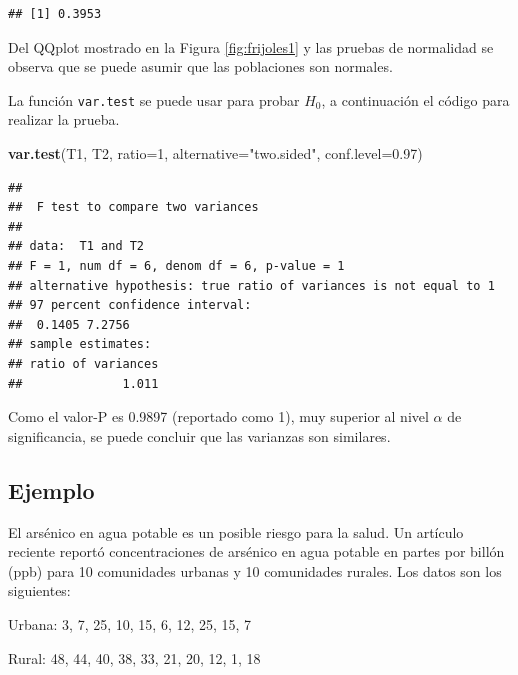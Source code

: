 \documentclass[10pt,]{krantz}
\makeatletter
\newenvironment{Shaded}{\begin{snugshade}}{\end{snugshade}}
\newcommand{\KeywordTok}[1]{\textcolor[rgb]{0.13,0.29,0.53}{\textbf{{#1}}}}
\newcommand{\DataTypeTok}[1]{\textcolor[rgb]{0.13,0.29,0.53}{{#1}}}
\newcommand{\DecValTok}[1]{\textcolor[rgb]{0.00,0.00,0.81}{{#1}}}
\newcommand{\FloatTok}[1]{\textcolor[rgb]{0.00,0.00,0.81}{{#1}}}
\newcommand{\StringTok}[1]{\textcolor[rgb]{0.31,0.60,0.02}{{#1}}}
\newcommand{\NormalTok}[1]{{#1}}
\newenvironment{kframe}{%
\medskip{}
\setlength{\fboxsep}{.8em}
 \def\at@end@of@kframe{}%
 \ifinner\ifhmode%
  \def\at@end@of@kframe{\end{minipage}}%
  \begin{minipage}{\columnwidth}%
 \fi\fi%
 \def\FrameCommand##1{\hskip\@totalleftmargin \hskip-\fboxsep
 \colorbox{shadecolor}{##1}\hskip-\fboxsep
     \hskip-\linewidth \hskip-\@totalleftmargin \hskip\columnwidth}%
 \MakeFramed {\advance\hsize-\width
   \@totalleftmargin\z@ \linewidth\hsize
   \@setminipage}}%
 {\par\unskip\endMakeFramed%
 \at@end@of@kframe}
\renewenvironment{Shaded}{\begin{kframe}}{\end{kframe}}
\makeatother
\begin{document}
\begin{Shaded}
\end{Shaded}

\begin{verbatim}
## [1] 0.3953
\end{verbatim}

Del QQplot mostrado en la Figura \ref{fig:frijoles1} y las pruebas de
normalidad se observa que se puede asumir que las poblaciones son
normales.

La función \texttt{var.test} se puede usar para probar \(H_0\), a
continuación el código para realizar la prueba.

\begin{Shaded}
\begin{Highlighting}[]
\KeywordTok{var.test}\NormalTok{(T1, T2, }\DataTypeTok{ratio=}\DecValTok{1}\NormalTok{, }\DataTypeTok{alternative=}\StringTok{"two.sided"}\NormalTok{,}
         \DataTypeTok{conf.level=}\FloatTok{0.97}\NormalTok{)}
\end{Highlighting}
\end{Shaded}

\begin{verbatim}
## 
##  F test to compare two variances
## 
## data:  T1 and T2
## F = 1, num df = 6, denom df = 6, p-value = 1
## alternative hypothesis: true ratio of variances is not equal to 1
## 97 percent confidence interval:
##  0.1405 7.2756
## sample estimates:
## ratio of variances 
##              1.011
\end{verbatim}

Como el valor-P es 0.9897 (reportado como 1), muy superior al nivel
\(\alpha\) de significancia, se puede concluir que las varianzas son
similares.

\subsection*{Ejemplo}\label{ejemplo-66}


El arsénico en agua potable es un posible riesgo para la salud. Un
artículo reciente reportó concentraciones de arsénico en agua potable en
partes por billón (ppb) para 10 comunidades urbanas y 10 comunidades
rurales. Los datos son los siguientes:

Urbana: 3, 7, 25, 10, 15, 6, 12, 25, 15, 7

Rural: 48, 44, 40, 38, 33, 21, 20, 12, 1, 18
\end{document}
